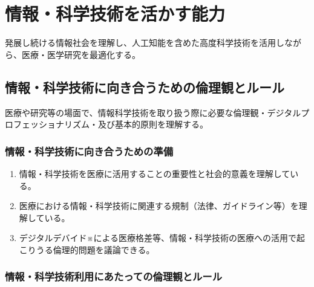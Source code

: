 \newpage

\hypertarget{ux60c5ux5831ux79d1ux5b66ux6280ux8853ux3092ux6d3bux304bux3059ux80fdux529b}{%
\section{情報・科学技術を活かす能力}\label{ux60c5ux5831ux79d1ux5b66ux6280ux8853ux3092ux6d3bux304bux3059ux80fdux529b}}

発展し続ける情報社会を理解し、人工知能を含めた高度科学技術を活用しながら、医療・医学研究を最適化する。

\hypertarget{ux60c5ux5831ux79d1ux5b66ux6280ux8853ux306bux5411ux304dux5408ux3046ux305fux3081ux306eux502bux7406ux89b3ux3068ux30ebux30fcux30eb}{%
\subsection{情報・科学技術に向き合うための倫理観とルール}\label{ux60c5ux5831ux79d1ux5b66ux6280ux8853ux306bux5411ux304dux5408ux3046ux305fux3081ux306eux502bux7406ux89b3ux3068ux30ebux30fcux30eb}}

医療や研究等の場面で、情報科学技術を取り扱う際に必要な倫理観・デジタルプロフェッショナリズム・及び基本的原則を理解する。

\hypertarget{ux60c5ux5831ux79d1ux5b66ux6280ux8853ux306bux5411ux304dux5408ux3046ux305fux3081ux306eux6e96ux5099}{%
\subsubsection{情報・科学技術に向き合うための準備}\label{ux60c5ux5831ux79d1ux5b66ux6280ux8853ux306bux5411ux304dux5408ux3046ux305fux3081ux306eux6e96ux5099}}

\begin{enumerate}
\def\labelenumi{\arabic{enumi}.}
\tightlist
\item
  情報・科学技術を医療に活用することの重要性と社会的意義を理解している。
\item
  医療における情報・科学技術に関連する規制（法律、ガイドライン等）を理解している。
\item
  デジタルデバイド※による医療格差等、情報・科学技術の医療への活用で起こりうる倫理的問題を議論できる。
\end{enumerate}

\hypertarget{ux60c5ux5831ux79d1ux5b66ux6280ux8853ux5229ux7528ux306bux3042ux305fux3063ux3066ux306eux502bux7406ux89b3ux3068ux30ebux30fcux30eb}{%
\subsubsection{情報・科学技術利用にあたっての倫理観とルール}\label{ux60c5ux5831ux79d1ux5b66ux6280ux8853ux5229ux7528ux306bux3042ux305fux3063ux3066ux306eux502bux7406ux89b3ux3068ux30ebux30fcux30eb}}

